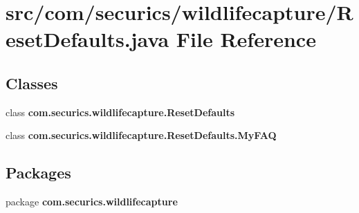 \section{src/com/securics/wildlifecapture/\+Reset\+Defaults.java File Reference}
\label{_reset_defaults_8java}
\subsection*{Classes}
\begin{DoxyCompactItemize}
\item 
class {\bf com.\+securics.\+wildlifecapture.\+Reset\+Defaults}
\item 
class {\bf com.\+securics.\+wildlifecapture.\+Reset\+Defaults.\+My\+F\+A\+Q}
\end{DoxyCompactItemize}
\subsection*{Packages}
\begin{DoxyCompactItemize}
\item 
package {\bf com.\+securics.\+wildlifecapture}
\end{DoxyCompactItemize}
